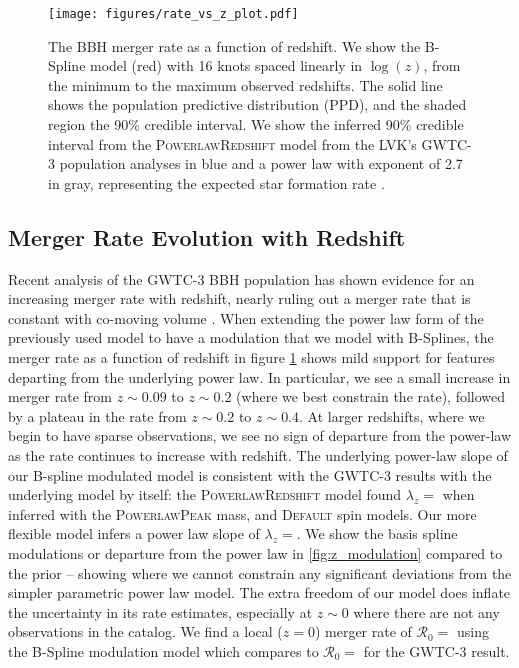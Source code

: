 \begin{figure}[h]
    \texttt{[image: figures/rate\_vs\_z\_plot.pdf]}
    \caption{The BBH merger rate as a function of redshift. We show the B-Spline model (red) with 16 knots spaced linearly in $\log(z)$, 
    from the minimum to the maximum observed redshifts. The solid line shows the population predictive distribution (PPD), and the shaded region 
    the 90\% credible interval. We show the inferred 90\% credible interval from the \textsc{PowerlawRedshift} model 
    from the LVK's GWTC-3 population analyses in blue and a power law with exponent of 2.7 in gray, representing the expected star formation rate 
    \citep{Madau_2014, o3b_astro_dist}.}
    \label{fig:rofz}
\end{figure}

\subsection{Merger Rate Evolution with Redshift} \label{sec:redshift}

Recent analysis of the GWTC-3 BBH population has shown evidence for an increasing merger rate with redshift, nearly ruling out a merger rate that is 
constant with co-moving volume \citep{Fishbach_2018redshift,o3b_astro_dist}. When extending the power law form of the previously used model to have a modulation 
that we model with B-Splines, the merger rate as a function of redshift in figure \ref{fig:rofz} shows mild support for features departing from the underlying power law. 
In particular, we see a small increase in merger rate from $z\sim0.09$ to $z\sim0.2$ (where we best constrain the rate), followed by a plateau in the rate from $z\sim0.2$ to $z\sim0.4$. 
At larger redshifts, where we begin to have sparse observations, we see no sign of departure from the power-law as the rate continues to increase with redshift. 
The underlying power-law slope of our B-spline modulated model is consistent with the GWTC-3 results with the underlying model by itself: the \textsc{PowerlawRedshift} model 
found $\lambda_z = $\result{$\CIPlusMinus{\macros[PLPeak][lamb]}$} when inferred with the \textsc{PowerlawPeak} mass, and \textsc{Default} spin models. Our more 
flexible model infers a power law slope of $\lambda_z = $\result{$\CIPlusMinus{\macros[BSplineIIDCompSpins][lamb]}$}. We show the basis spline modulations or departure 
from the power law in \ref{fig:z_modulation} compared to the prior -- showing where we cannot constrain any significant deviations from the simpler parametric power law model. 
The extra freedom of our model does inflate the uncertainty in its rate estimates, especially at $z\sim0$ where there are not any observations in the catalog. 
We find a local ($z=0$) merger rate of $\mathcal{R}_0 = $ using the B-Spline modulation model 
which compares to $\mathcal{R}_0 = $ for the GWTC-3 result. 

